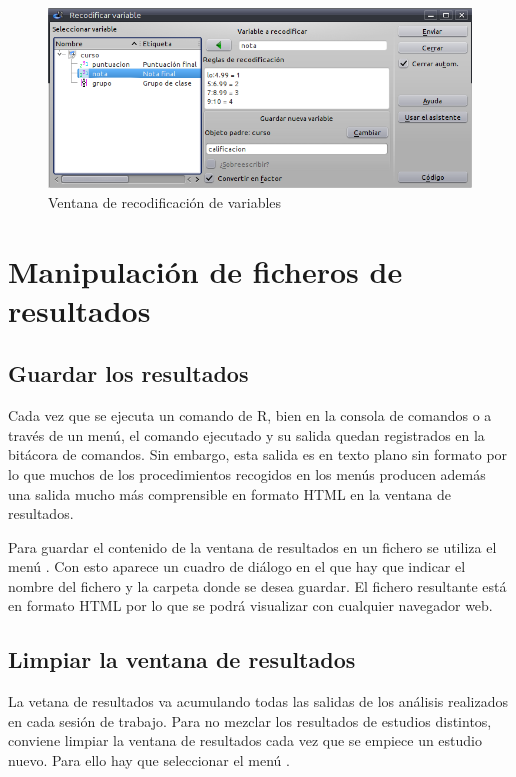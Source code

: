 \begin{figure}[htp]
\begin{center}
  \includegraphics[scale=0.6]{introduccion_r/img/recodificar}
  \caption{Ventana de recodificación de variables}
  \label{g:recodificar_variable}
\end{center}
\end{figure} 


\section{Manipulación de ficheros de resultados}

\subsection{Guardar los resultados}
Cada vez que se ejecuta un comando de R, bien en la consola de comandos o a través de un menú, el comando ejecutado y su
salida quedan registrados en la bitácora de comandos. Sin embargo, esta salida es en texto plano sin formato por lo que
muchos de los procedimientos recogidos en los menús producen además una salida mucho más comprensible en formato HTML en
la ventana de resultados.

Para guardar el contenido de la ventana de resultados en un fichero se utiliza el menú .
Con esto aparece un cuadro de diálogo en el que hay que indicar el nombre del fichero y la carpeta donde se desea
guardar. El fichero resultante está en formato HTML por lo que se podrá visualizar con cualquier navegador web.

\subsection{Limpiar la ventana de resultados}
La vetana de resultados va acumulando todas las salidas de los análisis realizados en cada sesión de trabajo. 
Para no mezclar los resultados de estudios distintos, conviene limpiar la ventana de resultados cada vez que se empiece un estudio nuevo.
Para ello hay que seleccionar el menú .
 

